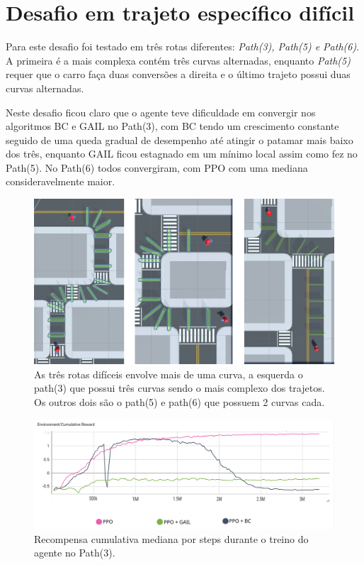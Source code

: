 \section{Desafio em trajeto específico difícil}
Para este desafio foi testado em três rotas diferentes: \textit{Path(3), Path(5) e Path(6)}. A primeira é a mais complexa contém três curvas alternadas, enquanto \textit{Path(5)} requer que o carro faça duas conversões a direita e o último trajeto possui duas curvas alternadas. 

Neste desafio ficou claro que o agente teve dificuldade em convergir nos algoritmos BC e GAIL no Path(3), com BC tendo um crescimento constante seguido de uma queda gradual de desempenho até atingir o patamar mais baixo dos três, enquanto GAIL ficou estagnado em um mínimo local assim como fez no Path(5). No Path(6) todos convergiram, com PPO com uma mediana consideravelmente maior.

\begin{figure}[h]
    \centering
    \includegraphics{figs/treinos/desafio-dificil/rotas.png}
    \caption{As três rotas difíceis envolve mais de uma curva, a esquerda o path(3) que possui três curvas sendo o mais complexo dos trajetos. Os outros dois são o path(5) e path(6) que possuem 2 curvas cada.}
\end{figure}

\begin{figure}[h]
    \centering
    \includegraphics[scale=0.35]{figs/treinos/desafio-dificil/path-3_recompensas-algos.png}
    \caption{Recompensa cumulativa mediana por steps durante o treino do agente no Path(3).}
\end{figure}

